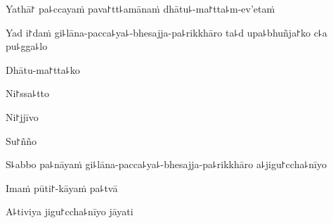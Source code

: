 
Yathā꜓ pa꜕ccayaṁ pava꜓tt꜕amānaṁ dhātu꜕-ma꜓tta꜕m-ev'etaṁ


Yad i꜓daṁ gi꜕lāna-pacca꜕ya꜕-bhesajja-pa꜕rikkhāro ta꜕d upa꜕bhuñja꜓ko c꜕a pu꜕gga꜕lo


Dhātu-ma꜓tta꜕ko


Ni꜓ssa꜕tto


Ni꜓jjīvo


Su꜓ñño


S꜕abbo pa꜕nāyaṁ gi꜕lāna-pacca꜕ya꜕-bhesajja-pa꜕rikkhāro a꜕jigu꜓ccha꜕nīyo


Imaṁ pūti꜓-kāyaṁ pa꜕tvā


A꜕tiviya jigu꜓ccha꜕nīyo jāyati


\clearpage

%
%
%
%
%
%

